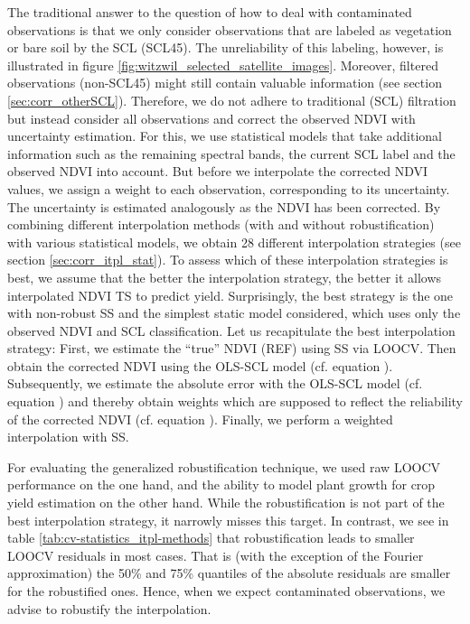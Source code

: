 The traditional answer to the question of how to deal with contaminated observations is that we only consider observations that are labeled as vegetation or bare soil by the SCL (SCL45). The unreliability of this labeling, however, is illustrated in figure \ref{fig:witzwil_selected_satellite_images}. Moreover, filtered observations (non-SCL45) might still contain valuable information (see section \ref{sec:corr_otherSCL}). Therefore, we do not adhere to traditional (SCL) filtration but instead consider all observations and correct the observed NDVI with uncertainty estimation. For this, we use statistical models that take additional information such as the remaining spectral bands, the current SCL label and the observed NDVI into account. But before we interpolate the corrected NDVI values, we assign a weight to each observation, corresponding to its uncertainty. The uncertainty is estimated analogously as the NDVI has been corrected. 
    By combining different interpolation methods (with and without robustification) with various statistical models, we obtain 28 different interpolation strategies (see section \ref{sec:corr_itpl_stat}). To assess which of these interpolation strategies is best, we assume that the better the interpolation strategy, the better it allows interpolated NDVI {TS} to predict yield. Surprisingly, the best strategy is the one with non-robust SS and the simplest static model considered, which uses only the observed NDVI and SCL classification.
Let us recapitulate the best interpolation strategy: First, we estimate the ``true'' NDVI (REF) using SS via LOOCV. Then obtain the corrected NDVI using the OLS-SCL model (cf. equation ). Subsequently, we estimate the absolute error with the OLS-SCL model (cf. equation ) and thereby obtain weights which are supposed to reflect the reliability of the corrected NDVI (cf. equation ). Finally, we perform a weighted interpolation with SS.

For evaluating the generalized robustification technique, we used raw LOOCV performance on the one hand, and the ability to model plant growth for crop yield estimation on the other hand.
While the robustification is not part of the best interpolation strategy, it narrowly misses this target. In contrast, we see in table \ref{tab:cv-statistics_itpl-methods} that robustification leads to smaller LOOCV residuals in most cases. That is (with the exception of the Fourier approximation) the 50\% and 75\% quantiles of the absolute residuals are smaller for the robustified ones. Hence, when we expect contaminated observations, we advise to robustify the interpolation. 

